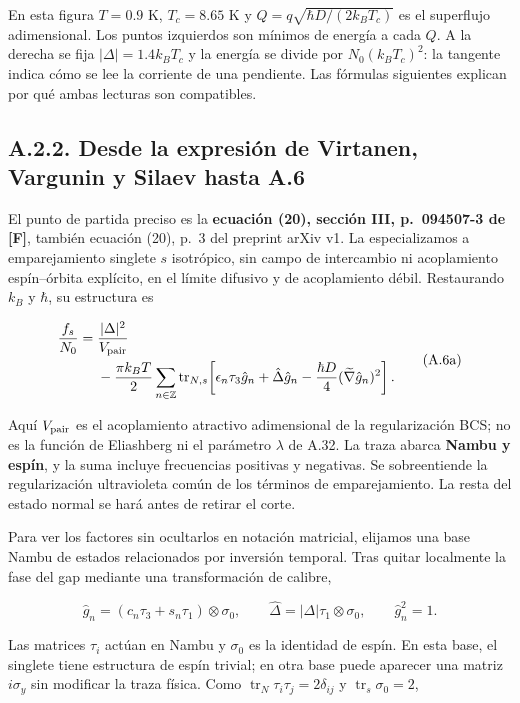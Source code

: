 \documentclass[
  spanish,
  10pt,
  a4paper,
]{article}
\begin{document}
En esta figura \(T=0.9\) K, \(T_c=8.65\) K y
\(Q=q\sqrt{\hbar D/(2k_BT_c)}\) es el superflujo adimensional. Los
puntos izquierdos son mínimos de energía a cada \(Q\). A la derecha se
fija \(|\Delta|=1.4k_BT_c\) y la energía se divide por
\(N_0(k_BT_c)^2\): la tangente indica cómo se lee la corriente de una
pendiente. Las fórmulas siguientes explican por qué ambas lecturas son
compatibles.

\subsection{A.2.2. Desde la expresión de Virtanen, Vargunin y Silaev
hasta
A.6}\label{a.2.2.-desde-la-expresiuxf3n-de-virtanen-vargunin-y-silaev-hasta-a.6}

El punto de partida preciso es la \textbf{ecuación (20), sección III,
p.~094507-3 de {[}F{]}}, también ecuación (20), p.~3 del preprint arXiv
v1. La especializamos a emparejamiento singlete \(s\) isotrópico, sin
campo de intercambio ni acoplamiento espín--órbita explícito, en el
límite difusivo y de acoplamiento débil. Restaurando \(k_B\) y
\(\hbar\), su estructura es

\[
\begin{aligned}
\frac{f_s}{N_0}
={}&\frac{|\Delta|^2}{V_{\rm pair}}\\
&-\frac{\pi k_BT}{2}\sum_{n\in\mathbb Z}
\operatorname{tr}_{N,s}\!\left[
\epsilon_n\tau_3\hat g_n+\hat\Delta\hat g_n
-\frac{\hbar D}{4}(\widetilde\nabla\hat g_n)^2
\right].
\end{aligned}
\tag{A.6a}
\]

Aquí \(V_{\rm pair}\) es el acoplamiento atractivo adimensional de la
regularización BCS; no es la función de Eliashberg ni el parámetro
\(\lambda\) de A.32. La traza abarca \textbf{Nambu y espín}, y la suma
incluye frecuencias positivas y negativas. Se sobreentiende la
regularización ultravioleta común de los términos de emparejamiento. La
resta del estado normal se hará antes de retirar el corte.

Para ver los factores sin ocultarlos en notación matricial, elijamos una
base Nambu de estados relacionados por inversión temporal. Tras quitar
localmente la fase del gap mediante una transformación de calibre,

\[
\hat g_n=(c_n\tau_3+s_n\tau_1)\otimes\sigma_0,
\qquad \hat\Delta=|\Delta|\tau_1\otimes\sigma_0,
\qquad \hat g_n^2=1.
\tag{A.6b}
\]

Las matrices \(\tau_i\) actúan en Nambu y \(\sigma_0\) es la identidad
de espín. En esta base, el singlete tiene estructura de espín trivial;
en otra base puede aparecer una matriz \(i\sigma_y\) sin modificar la
traza física. Como \(\operatorname{tr}_N\tau_i\tau_j=2\delta_{ij}\) y
\(\operatorname{tr}_s\sigma_0=2\),
\end{document}
